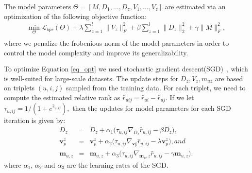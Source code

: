The model parameters $\Theta=[M, D_1, \ldots , D_z, V_1, \ldots ,V_z ]$ are estimated 
via an optimization of the following objective function:
%
\begin{equation} \label{eq_opt}
\begin{split}
  \min_{\Theta}
  \mathcal{L}_{bpr}(\Theta) + \lambda \sum_{z=1}^l \|V_z\|_F^2 + \beta
  \sum_{z=1}^l \|D_z\|_2^2 + \gamma \|M\|_F^2, \\
\end{split}
\end{equation}
%
where we penalize the frobenious norm of the model parameters in order to
control the model complexity and improve its generalizability.
%


To optimize Equation \ref{eq_opt} we used stochastic gradient
descent(SGD)~\cite{bottou2010large}, which is well-suited for large-scale datasets. The update
steps for $D_z, V_z, m_{uz}$ are based on triplets $(u,i,j)$ sampled from the training
data. For each triplet, we need to compute the estimated
relative rank as $\hat{r}_{uij} = \hat{r}_{ui} - \hat{r}_{uj}$. If we let
$
\tau_{u,ij} = 1/(1 + e^{\hat{r}_{u,ij}}),
$
then the updates for model parameters for each SGD iteration is given by:
\begin{eqnarray}
  D_z &=&  D_z + \alpha_1 \Big( \tau_{u,ij}  \nabla_{D_z} \hat{r}_{u,ij} -
  \beta D_z  \Big), \label{dUpdBPREq}\\ 
  \bm{v}_{p}^z &=&  \bm{v}_{p}^z + \alpha_2 \Big(  \tau_{u,ij}
  \nabla_{\bm{v}_{p}^z} \hat{r}_{u,ij} - \lambda \bm{v}_p^z  \Big), \label{vUpdBPREq} and \\ 
  \bm{m}_{u,z} &=& \bm{m}_{u,z} + \alpha_3 \Big( \tau_{u,ij} \nabla_{\bm{m}_u,z}
  \hat{r}_{u,ij} - \gamma \bm{m}_{u,z} \Big).  \label{mUpdBPREq} 
\end{eqnarray}
where $\alpha_1$, $\alpha_2$ and $\alpha_3$ are the learning rates of the SGD.

